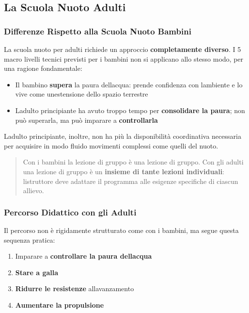 \documentclass[a4paper,11pt]{article}
\providecommand{\tightlist}{%
  \setlength{\itemsep}{0pt}\setlength{\parskip}{0pt}}
\begin{document}
\subsection{La Scuola Nuoto Adulti}\label{la-scuola-nuoto-adulti}

\subsubsection{Differenze Rispetto alla Scuola Nuoto
      Bambini}\label{differenze-rispetto-alla-scuola-nuoto-bambini}

La scuola nuoto per adulti richiede un approccio \textbf{completamente
      diverso}. I 5 macro livelli tecnici previsti per i bambini non si
applicano allo stesso modo, per una ragione fondamentale:

\begin{itemize}
      \tightlist
      \item
            Il bambino \textbf{supera} la paura dell\textquotesingle acqua: prende
            confidenza con l\textquotesingle ambiente e lo vive come
            un\textquotesingle estensione dello spazio terrestre
      \item
            L\textquotesingle adulto principiante ha avuto troppo tempo per
            \textbf{consolidare la paura}; non può superarla, ma può imparare a
            \textbf{controllarla}
\end{itemize}

L\textquotesingle adulto principiante, inoltre, non ha più la
disponibilità coordinativa necessaria per acquisire in modo fluido
movimenti complessi come quelli del nuoto.

\begin{quote}
      Con i bambini la lezione di gruppo è una lezione di gruppo. Con gli
      adulti una lezione di gruppo è un \textbf{insieme di tante lezioni
            individuali}: l\textquotesingle istruttore deve adattare il programma
      alle esigenze specifiche di ciascun allievo.
\end{quote}

\subsubsection{Percorso Didattico con gli
      Adulti}\label{percorso-didattico-con-gli-adulti}

Il percorso non è rigidamente strutturato come con i bambini, ma segue
questa sequenza pratica:

\begin{enumerate}
      \tightlist
      \item
            Imparare a \textbf{controllare la paura dell\textquotesingle acqua}
      \item
            \textbf{Stare a galla}
      \item
            \textbf{Ridurre le resistenze} all\textquotesingle avanzamento
      \item
            \textbf{Aumentare la propulsione}
\end{enumerate}
\end{document}
